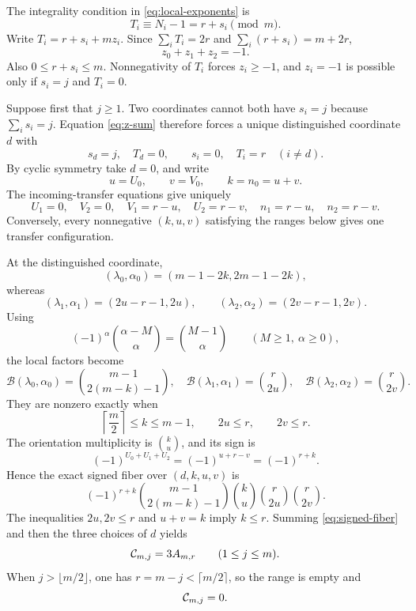 \documentclass[11pt]{article}
\theoremstyle{definition}
\theoremstyle{remark}
\begin{document}
The integrality condition in \eqref{eq:local-exponents} is
\begin{equation}
T_i\equiv N_i-1=r+s_i\pmod m.
\label{eq:transfer-congruence}
\end{equation}
Write \(T_i=r+s_i+mz_i\).  Since
\(\sum_iT_i=2r\) and \(\sum_i(r+s_i)=m+2r\),
\begin{equation}
z_0+z_1+z_2=-1.
\label{eq:z-sum}
\end{equation}
Also \(0\le r+s_i\le m\).  Nonnegativity of \(T_i\) forces
\(z_i\ge-1\), and \(z_i=-1\) is possible only if \(s_i=j\) and
\(T_i=0\).

Suppose first that \(j\ge1\).  Two coordinates cannot both have \(s_i=j\)
because \(\sum_i s_i=j\).  Equation \eqref{eq:z-sum} therefore forces a
unique distinguished coordinate \(d\) with
\begin{equation}
s_d=j,\quad T_d=0,
\qquad
s_i=0,\quad T_i=r\quad(i\ne d).
\label{eq:distinguished-coordinate}
\end{equation}
By cyclic symmetry take \(d=0\), and write
\[
u=U_0,
\qquad
v=V_0,
\qquad
k=n_0=u+v.
\]
The incoming-transfer equations give uniquely
\begin{equation}
U_1=0,\quad V_2=0,\quad
V_1=r-u,\quad U_2=r-v,\quad
n_1=r-u,\quad n_2=r-v.
\label{eq:incoming-flow}
\end{equation}
Conversely, every nonnegative \((k,u,v)\) satisfying the ranges below gives
one transfer configuration.

At the distinguished coordinate,
\[
(\lambda_0,\alpha_0)=(m-1-2k,2m-1-2k),
\]
whereas
\[
(\lambda_1,\alpha_1)=(2u-r-1,2u),
\qquad
(\lambda_2,\alpha_2)=(2v-r-1,2v).
\]
Using
\[
(-1)^\alpha\binom{\alpha-M}{\alpha}=\binom{M-1}{\alpha}
\qquad(M\ge1,\ \alpha\ge0),
\]
the local factors become
\begin{equation}
\mathcal{B}(\lambda_0,\alpha_0)
=\binom{m-1}{2(m-k)-1},
\quad
\mathcal{B}(\lambda_1,\alpha_1)=\binom{r}{2u},
\quad
\mathcal{B}(\lambda_2,\alpha_2)=\binom{r}{2v}.
\label{eq:three-local-factors}
\end{equation}
They are nonzero exactly when
\begin{equation}
\left\lceil\frac m2\right\rceil\le k\le m-1,
\qquad
2u\le r,
\qquad
2v\le r.
\label{eq:guarded-ranges}
\end{equation}
The orientation multiplicity is \(\binom{k}{u}\), and its sign is
\[
(-1)^{U_0+U_1+U_2}=(-1)^{u+r-v}=(-1)^{r+k}.
\]
Hence the exact signed fiber over \((d,k,u,v)\) is
\begin{equation}
(-1)^{r+k}
\binom{m-1}{2(m-k)-1}
\binom{k}{u}\binom{r}{2u}\binom{r}{2v}.
\label{eq:signed-fiber}
\end{equation}
The inequalities \(2u,2v\le r\) and \(u+v=k\) imply \(k\le r\).
Summing \eqref{eq:signed-fiber} and then the three choices of \(d\) yields
\begin{equation}
\mathcal{C}_{m,j}=3A_{m,r}
\qquad(1\le j\le m).
\label{eq:C-collapse-positive-j}
\end{equation}
When \(j>\lfloor m/2\rfloor\), one has
\(r=m-j<\lceil m/2\rceil\), so the range is empty and
\begin{equation}
\mathcal{C}_{m,j}=0.
\label{eq:C-empty-range}
\end{equation}
\end{document}
